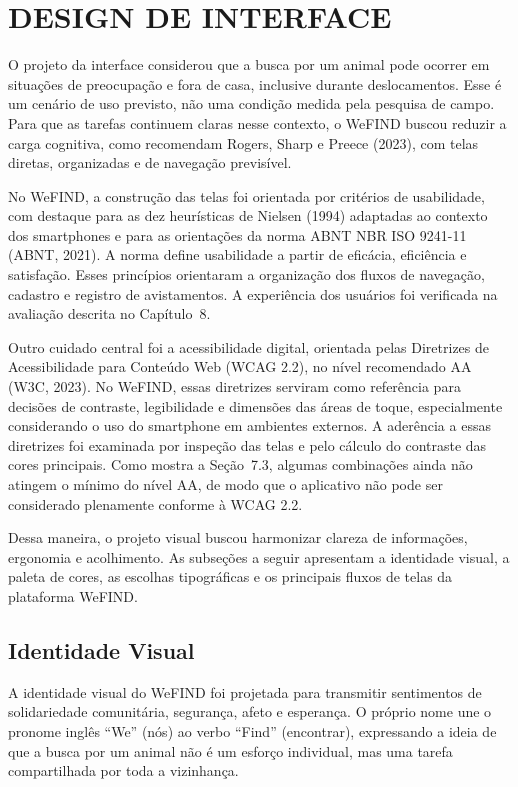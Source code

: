 \section{DESIGN DE INTERFACE}

O projeto da interface considerou que a busca por um animal pode ocorrer em situações de preocupação e fora de casa, inclusive durante deslocamentos. Esse é um cenário de uso previsto, não uma condição medida pela pesquisa de campo. Para que as tarefas continuem claras nesse contexto, o WeFIND buscou reduzir a carga cognitiva, como recomendam Rogers, Sharp e Preece (2023), com telas diretas, organizadas e de navegação previsível.

No WeFIND, a construção das telas foi orientada por critérios de usabilidade, com destaque para as dez heurísticas de Nielsen (1994) adaptadas ao contexto dos smartphones e para as orientações da norma ABNT NBR ISO 9241-11 (ABNT, 2021). A norma define usabilidade a partir de eficácia, eficiência e satisfação. Esses princípios orientaram a organização dos fluxos de navegação, cadastro e registro de avistamentos. A experiência dos usuários foi verificada na avaliação descrita no Capítulo~8.

Outro cuidado central foi a acessibilidade digital, orientada pelas Diretrizes de Acessibilidade para Conteúdo Web (WCAG 2.2), no nível recomendado AA (W3C, 2023). No WeFIND, essas diretrizes serviram como referência para decisões de contraste, legibilidade e dimensões das áreas de toque, especialmente considerando o uso do smartphone em ambientes externos. A aderência a essas diretrizes foi examinada por inspeção das telas e pelo cálculo do contraste das cores principais. Como mostra a Seção~7.3, algumas combinações ainda não atingem o mínimo do nível AA, de modo que o aplicativo não pode ser considerado plenamente conforme à WCAG 2.2.

Dessa maneira, o projeto visual buscou harmonizar clareza de informações, ergonomia e acolhimento. As subseções a seguir apresentam a identidade visual, a paleta de cores, as escolhas tipográficas e os principais fluxos de telas da plataforma WeFIND.


\subsection{Identidade Visual}

A identidade visual do WeFIND foi projetada para transmitir sentimentos de solidariedade comunitária, segurança, afeto e esperança. O próprio nome une o pronome inglês ``We'' (nós) ao verbo ``Find'' (encontrar), expressando a ideia de que a busca por um animal não é um esforço individual, mas uma tarefa compartilhada por toda a vizinhança.


